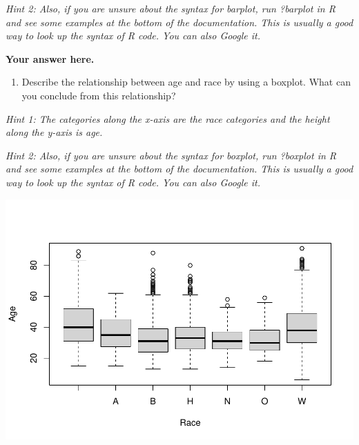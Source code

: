 \documentclass[
]{article}
\newenvironment{Shaded}{\begin{snugshade}}{\end{snugshade}}
\newcommand{\AttributeTok}[1]{\textcolor[rgb]{0.77,0.63,0.00}{#1}}
\newcommand{\FunctionTok}[1]{\textcolor[rgb]{0.00,0.00,0.00}{#1}}
\newcommand{\NormalTok}[1]{#1}
\newcommand{\SpecialCharTok}[1]{\textcolor[rgb]{0.00,0.00,0.00}{#1}}
\newcommand{\StringTok}[1]{\textcolor[rgb]{0.31,0.60,0.02}{#1}}
\providecommand{\tightlist}{%
  \setlength{\itemsep}{0pt}\setlength{\parskip}{0pt}}
\begin{document}
\emph{Hint 2: Also, if you are unsure about the syntax for barplot, run
?barplot in R and see some examples at the bottom of the documentation.
This is usually a good way to look up the syntax of R code. You can also
Google it.}

\textbf{Your answer here.}

\begin{enumerate}
\def\labelenumi{\alph{enumi}.}
\setcounter{enumi}{1}
\tightlist
\item
  Describe the relationship between age and race by using a boxplot.
  What can you conclude from this relationship?
\end{enumerate}

\emph{Hint 1: The categories along the x-axis are the race categories
and the height along the y-axis is age.}

\emph{Hint 2: Also, if you are unsure about the syntax for boxplot, run
?boxplot in R and see some examples at the bottom of the documentation.
This is usually a good way to look up the syntax of R code. You can also
Google it.}

\begin{Shaded}
\end{Shaded}

\includegraphics{Journal_files/figure-latex/unnamed-chunk-29-1.pdf}
\end{document}
